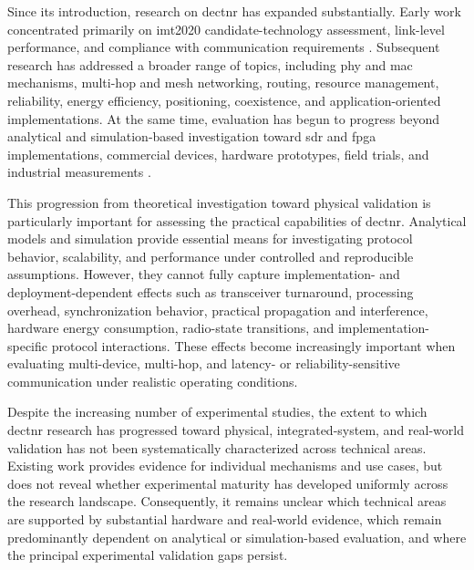 \documentclass[conference]{IEEEtran}
\begin{document}
Since its introduction, research on \gls{dectnr} has expanded
substantially. Early work concentrated primarily on \gls{imt2020}
candidate-technology assessment, link-level performance, and
compliance with communication requirements
\cite{pennerURLLCPerformanceEvaluation2021,
maliatsosEvaluationIMT2020Candidate2022a,
smidaETSIDECT2020Component2023}. Subsequent research has addressed a
broader range of topics, including \gls{phy} and \gls{mac}
mechanisms, multi-hop and mesh networking, routing, resource
management, reliability, energy efficiency, positioning,
coexistence, and application-oriented implementations. At the same
time, evaluation has begun to progress beyond analytical and
simulation-based investigation toward \gls{sdr} and \gls{fpga}
implementations, commercial devices, hardware prototypes, field
trials, and industrial measurements
\cite{fagerholmFPGAbasedDECT2020New2024,
wassmannPerformanceDECT2020NR2024,
bandaraExperimentalValidationAnalysis2025,
grafWhatExpectWhen2026}.

This progression from theoretical investigation toward physical
validation is particularly important for assessing the practical
capabilities of \gls{dectnr}. Analytical models and simulation provide
essential means for investigating protocol behavior, scalability, and
performance under controlled and reproducible assumptions. However,
they cannot fully capture implementation- and deployment-dependent
effects such as transceiver turnaround, processing overhead,
synchronization behavior, practical propagation and interference,
hardware energy consumption, radio-state transitions, and
implementation-specific protocol interactions. These effects become
increasingly important when evaluating multi-device, multi-hop, and
latency- or reliability-sensitive communication under realistic
operating conditions.

Despite the increasing number of experimental studies, the extent to
which \gls{dectnr} research has progressed toward physical,
integrated-system, and real-world validation has not been
systematically characterized across technical areas. Existing work
provides evidence for individual mechanisms and use cases, but does
not reveal whether experimental maturity has developed uniformly
across the research landscape. Consequently, it remains unclear which
technical areas are supported by substantial hardware and real-world
evidence, which remain predominantly dependent on analytical or
simulation-based evaluation, and where the principal experimental
validation gaps persist.
\end{document}
